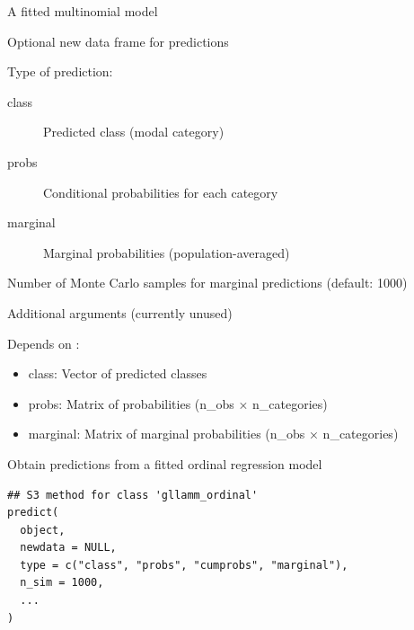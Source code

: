 \documentclass[a4paper]{book}
\begin{document}
\begin{Arguments}
\begin{ldescription}
\item[\code{object}] A fitted multinomial model

\item[\code{newdata}] Optional new data frame for predictions

\item[\code{type}] Type of prediction:
\begin{description}

\item[class] Predicted class (modal category)
\item[probs] Conditional probabilities for each category
\item[marginal] Marginal probabilities (population-averaged)

\end{description}


\item[\code{n\_sim}] Number of Monte Carlo samples for marginal predictions (default: 1000)

\item[\code{...}] Additional arguments (currently unused)
\end{ldescription}
\end{Arguments}
%
\begin{Value}
Depends on :
\begin{itemize}

\item{} class: Vector of predicted classes
\item{} probs: Matrix of probabilities (n\_obs × n\_categories)
\item{} marginal: Matrix of marginal probabilities (n\_obs × n\_categories)

\end{itemize}

\end{Value}
%
\begin{Description}
Obtain predictions from a fitted ordinal regression model
\end{Description}
%
\begin{Usage}
\begin{verbatim}
## S3 method for class 'gllamm_ordinal'
predict(
  object,
  newdata = NULL,
  type = c("class", "probs", "cumprobs", "marginal"),
  n_sim = 1000,
  ...
)
\end{verbatim}
\end{Usage}
\end{document}
